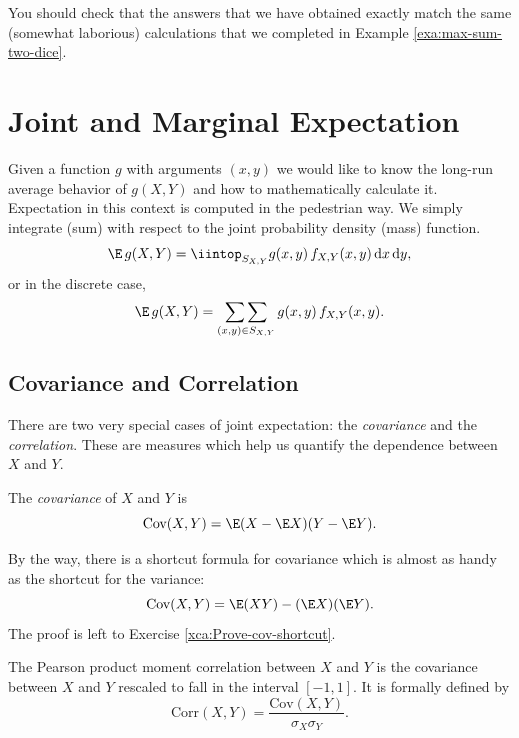 \documentclass[captions=tableheading]{scrbook}
\begin{document}
You should check that the answers that we have obtained exactly match the same (somewhat laborious) calculations that we completed in Example \ref{exa:max-sum-two-dice}.
\section{Joint and Marginal Expectation}
\label{sec-7-2}

\label{sec:Joint-and-Marginal-Expectation}

Given a function \(g\) with arguments \((x,y)\) we would like to know the long-run average behavior of \(g(X,Y)\) and how to mathematically calculate it. Expectation in this context is computed in the pedestrian way. We simply integrate (sum) with respect to the joint probability density (mass) function.
\begin{equation}
\E\, g(X,Y)=\iintop_{S_{X,Y}}g(x,y)\, f_{X,Y}(x,y)\,\mathrm{d} x\,\mathrm{d} y,
\end{equation}
or in the discrete case,
\begin{equation}
\E\, g(X,Y)=\mathop{\sum\sum}\limits _{(x,y)\in S_{X,Y}}g(x,y)\, f_{X,Y}(x,y).
\end{equation}
\subsection{Covariance and Correlation}
\label{sec-7-2-1}


There are two very special cases of joint expectation: the \emph{covariance} and the \emph{correlation}. These are measures which help us quantify the dependence between \(X\) and \(Y\). 

\begin{defn}
The \emph{covariance} of \(X\) and \(Y\) is
\begin{equation}
\mbox{Cov}(X,Y)=\E(X-\E X)(Y-\E Y).
\end{equation}
\end{defn}

By the way, there is a shortcut formula for covariance which is almost as handy as the shortcut for the variance:
\begin{equation}
\mbox{Cov}(X,Y)=\E(XY)-(\E X)(\E Y).
\end{equation}
The proof is left to Exercise \ref{xca:Prove-cov-shortcut}.

The Pearson product moment correlation between \(X\) and \(Y\) is the covariance between \(X\) and \(Y\) rescaled to fall in the interval \([-1,1]\). It is formally defined by 
\begin{equation}
\mbox{Corr}(X,Y)=\frac{\mbox{Cov}(X,Y)}{\sigma_{X}\sigma_{Y}}.
\end{equation}
\end{document}
